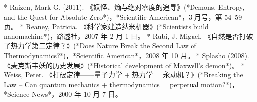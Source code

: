 \begin{itemize}
* Raizen, Mark G. (2011). 《妖怪、熵与绝对零度的追寻》(*Demons, Entropy, and the Quest for Absolute Zero*)，*Scientific American*，3 月号，第 54–59 页。
* Reaney, Patricia. 《科学家建造纳米机器》(*Scientists build nanomachine*)，路透社，2007 年 2 月 1 日。
* Rubi, J. Miguel. 《自然是否打破了热力学第二定律？》(*Does Nature Break the Second Law of Thermodynamics?*)，*Scientific American*，2008 年 10 月。
* Splasho (2008). 《麦克斯韦妖的历史发展》(*Historical development of Maxwell's demon*)。
* Weiss, Peter. 《打破定律——量子力学 + 热力学 = 永动机？》(*Breaking the Law – Can quantum mechanics + thermodynamics = perpetual motion?*)，*Science News*，2000 年 10 月 7 日。

\end{itemize}